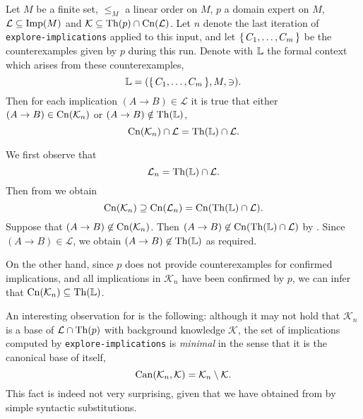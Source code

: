 \begin{Theorem}
  \label{thm:explore-implications-counterexamples-context}
  Let $M$ be a finite set, $\leq_{M}$ a linear order on $M$, $p$ a domain expert on $M$,
  $\mathcal{L} \subseteq \operatorname{Imp}(M)$ and $\mathcal{K} \subseteq \operatorname{Th}(p) \cap
  \operatorname{Cn}(\mathcal{L})$.  Let $n$ denote the last iteration of
  \lstinline{explore-implications} applied to this input, and let ${\{\, C_{1}, \dots,
    C_{m} \,\}}$ be the counterexamples given by $p$ during this run.  Denote with ${\mathbb{L}}$
  the formal context which arises from these counterexamples, \ie
  \begin{equation*}
    {\ensuremath{\mathbb{L}}} = ({\{\, C_{1}, \dots, C_{m} \,\}}, M, \ni).
  \end{equation*}
  Then for each implication $(A \to B) \in \mathcal{L}$ it is true that either $(A \to B)
  \in \operatorname{Cn}(\mathcal{K}_{n})$ or $(A \to B) \notin \operatorname{Th}({\mathbb{L}})$, \ie
  \begin{equation*}
    \operatorname{Cn}(\mathcal{K}_{n}) \cap \mathcal{L} = \operatorname{Th}({\mathbb{L}}) \cap \mathcal{L}.
  \end{equation*}
\end{Theorem}
\begin{Proof}
  We first observe that
  \begin{equation}
    \label{eq:40}
    \mathcal{L}_{n} = \operatorname{Th}({\mathbb{L}}) \cap \mathcal{L}.
  \end{equation}
  Then from  we obtain
  \begin{equation}
    \label{eq:37}
    \operatorname{Cn}(\mathcal{K}_{n}) \supseteq \operatorname{Cn}(\mathcal{L}_{n}) = \operatorname{Cn}(\operatorname{Th}({\mathbb{L}}) \cap \mathcal{L}).
  \end{equation}
  Suppose that $(A \to B) \not\in \operatorname{Cn}(\mathcal{K}_{n})$.  Then $(A \to B) \not\in
  \operatorname{Cn}(\operatorname{Th}({\mathbb{L}}) \cap \mathcal{L})$ by .  Since $(A \to B) \in \mathcal{L}$,
  we obtain $(A \to B) \not\in \operatorname{Th}({\mathbb{L}})$ as required.

  On the other hand, since $p$ does not provide counterexamples for confirmed
  implications, and all implications in $\mathcal{K}_{n}$ have been confirmed by $p$, we
  can infer that $\operatorname{Cn}(\mathcal{K}_{n}) \subseteq \operatorname{Th}({\mathbb{L}})$.
\end{Proof}

An interesting observation for  is the following: although
it may not hold that $\mathcal{K}_{n}$ is a base of $\mathcal{L} \cap \operatorname{Th}(p)$ with
background knowledge $\mathcal{K}$, the set of implications computed by
\lstinline{explore-implications} is \emph{minimal} in the sense that it is the canonical
base of itself, \ie
\begin{equation*}
  \operatorname{Can}(\mathcal{K}_{n}, \mathcal{K}) = \mathcal{K}_{n} \setminus \mathcal{K}.
\end{equation*}
This fact is indeed not very surprising, given that we have obtained
 from
 by simple syntactic
substitutions.

